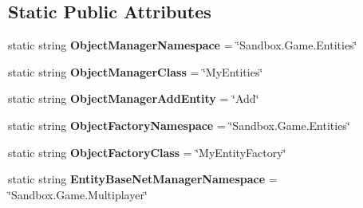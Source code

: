 \subsection*{Static Public Attributes}
\begin{DoxyCompactItemize}
\item 
\hypertarget{class_s_e_mod_a_p_i_internal_1_1_a_p_i_1_1_entity_1_1_sector_object_manager_ab79d99aa9aa7830c49f02972dd300d56}{}static string {\bfseries Object\+Manager\+Namespace} = \char`\"{}Sandbox.\+Game.\+Entities\char`\"{}\label{class_s_e_mod_a_p_i_internal_1_1_a_p_i_1_1_entity_1_1_sector_object_manager_ab79d99aa9aa7830c49f02972dd300d56}

\item 
\hypertarget{class_s_e_mod_a_p_i_internal_1_1_a_p_i_1_1_entity_1_1_sector_object_manager_a4db182b1031bbe82c52b796fb585411c}{}static string {\bfseries Object\+Manager\+Class} = \char`\"{}My\+Entities\char`\"{}\label{class_s_e_mod_a_p_i_internal_1_1_a_p_i_1_1_entity_1_1_sector_object_manager_a4db182b1031bbe82c52b796fb585411c}

\item 
\hypertarget{class_s_e_mod_a_p_i_internal_1_1_a_p_i_1_1_entity_1_1_sector_object_manager_a322ec171d5d4ebd692cdfc663f5fff88}{}static string {\bfseries Object\+Manager\+Add\+Entity} = \char`\"{}Add\char`\"{}\label{class_s_e_mod_a_p_i_internal_1_1_a_p_i_1_1_entity_1_1_sector_object_manager_a322ec171d5d4ebd692cdfc663f5fff88}

\item 
\hypertarget{class_s_e_mod_a_p_i_internal_1_1_a_p_i_1_1_entity_1_1_sector_object_manager_a579f638e8b06b482ee04a5ccf8f96d04}{}static string {\bfseries Object\+Factory\+Namespace} = \char`\"{}Sandbox.\+Game.\+Entities\char`\"{}\label{class_s_e_mod_a_p_i_internal_1_1_a_p_i_1_1_entity_1_1_sector_object_manager_a579f638e8b06b482ee04a5ccf8f96d04}

\item 
\hypertarget{class_s_e_mod_a_p_i_internal_1_1_a_p_i_1_1_entity_1_1_sector_object_manager_ad59a39b17e5570b0459f14647b14eb84}{}static string {\bfseries Object\+Factory\+Class} = \char`\"{}My\+Entity\+Factory\char`\"{}\label{class_s_e_mod_a_p_i_internal_1_1_a_p_i_1_1_entity_1_1_sector_object_manager_ad59a39b17e5570b0459f14647b14eb84}

\item 
\hypertarget{class_s_e_mod_a_p_i_internal_1_1_a_p_i_1_1_entity_1_1_sector_object_manager_a5c3831b0faf2b8d9048eb14ee0ec837d}{}static string {\bfseries Entity\+Base\+Net\+Manager\+Namespace} = \char`\"{}Sandbox.\+Game.\+Multiplayer\char`\"{}\label{class_s_e_mod_a_p_i_internal_1_1_a_p_i_1_1_entity_1_1_sector_object_manager_a5c3831b0faf2b8d9048eb14ee0ec837d}


\end{DoxyCompactItemize}
